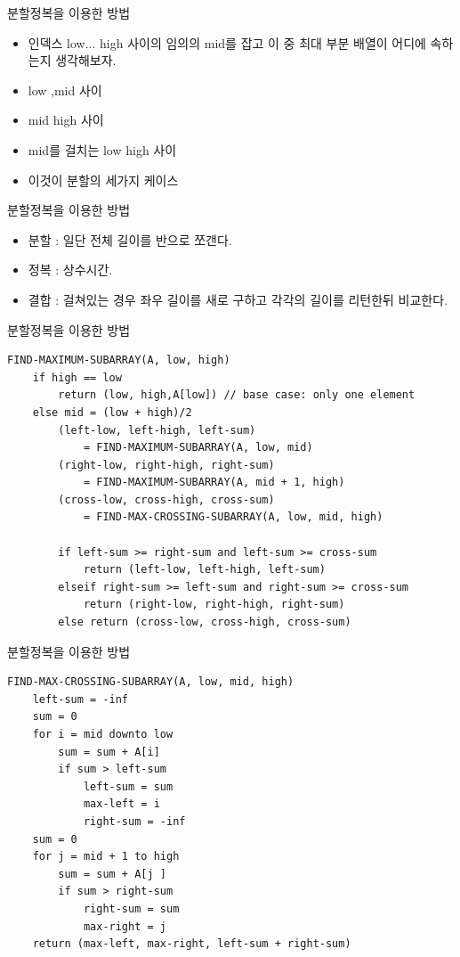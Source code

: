 \documentclass[10pt]{beamer}
\begin{document}
\begin{frame}{분할정복을 이용한 방법}
    \begin{itemize}
        \item 인덱스 low... high 사이의 임의의 mid를 잡고 이 중 최대 부분 배열이 어디에 속하는지 생각해보자.  \pause
        \item low ,mid 사이 \pause
        \item mid high 사이 \pause
        \item mid를 걸치는 low high 사이 \pause
        \item 이것이 분할의 세가지 케이스
    \end{itemize}
\end{frame}

\begin{frame}{분할정복을 이용한 방법}
    \begin{itemize}
        \item 분할 : 일단 전체 길이를 반으로 쪼갠다. \pause
        \item 정복 : 상수시간. \pause
        \item 결합 : 걸쳐있는 경우 좌우 길이를 새로 구하고 각각의 길이를 리턴한뒤 비교한다.
    \end{itemize}
\end{frame}


\begin{frame}[fragile]{분할정복을 이용한 방법}
    \begin{lstlisting}[style = CppStyle]
    FIND-MAXIMUM-SUBARRAY(A, low, high)
    if high == low
        return (low, high,A[low]) // base case: only one element
    else mid = (low + high)/2 
        (left-low, left-high, left-sum) 
            = FIND-MAXIMUM-SUBARRAY(A, low, mid)
        (right-low, right-high, right-sum) 
            = FIND-MAXIMUM-SUBARRAY(A, mid + 1, high)
        (cross-low, cross-high, cross-sum) 
            = FIND-MAX-CROSSING-SUBARRAY(A, low, mid, high)

        if left-sum >= right-sum and left-sum >= cross-sum
            return (left-low, left-high, left-sum)
        elseif right-sum >= left-sum and right-sum >= cross-sum
            return (right-low, right-high, right-sum)
        else return (cross-low, cross-high, cross-sum)
    \end{lstlisting}
\end{frame}    

\begin{frame}[fragile]{분할정복을 이용한 방법}
    \begin{lstlisting}[style = CppStyle]
    FIND-MAX-CROSSING-SUBARRAY(A, low, mid, high)
    left-sum = -inf
    sum = 0
    for i = mid downto low
        sum = sum + A[i]
        if sum > left-sum
            left-sum = sum
            max-left = i
            right-sum = -inf
    sum = 0
    for j = mid + 1 to high
        sum = sum + A[j ]
        if sum > right-sum
            right-sum = sum
            max-right = j
    return (max-left, max-right, left-sum + right-sum)
    \end{lstlisting}
\end{frame}    
\end{document}
